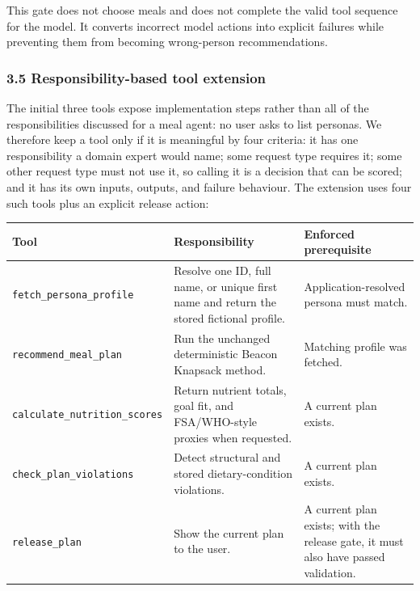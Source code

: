 \documentclass[
  10pt,
  letterpaper,
]{article}
\begin{document}
This gate does not choose meals and does not complete the valid tool
sequence for the model. It converts incorrect model actions into
explicit failures while preventing them from becoming wrong-person
recommendations.

\subsubsection{3.5 Responsibility-based tool
extension}\label{responsibility-based-tool-extension}

The initial three tools expose implementation steps rather than all of
the responsibilities discussed for a meal agent: no user asks to list
personas. We therefore keep a tool only if it is meaningful by four
criteria: it has one responsibility a domain expert would name; some
request type requires it; some other request type must not use it, so
calling it is a decision that can be scored; and it has its own inputs,
outputs, and failure behaviour. The extension uses four such tools plus
an explicit release action:

\begin{longtable}[]{@{}
  >{\raggedright\arraybackslash}p{}
  >{\raggedright\arraybackslash}p{}
  >{\raggedright\arraybackslash}p{}@{}}
\toprule\noalign{}
\begin{minipage}[b]{\linewidth}\raggedright
Tool
\end{minipage} & \begin{minipage}[b]{\linewidth}\raggedright
Responsibility
\end{minipage} & \begin{minipage}[b]{\linewidth}\raggedright
Enforced prerequisite
\end{minipage} \\
\midrule\noalign{}
\endhead
\bottomrule\noalign{}
\endlastfoot
\texttt{fetch\_persona\_profile} & Resolve one ID, full name, or unique
first name and return the stored fictional profile. &
Application-resolved persona must match. \\
\texttt{recommend\_meal\_plan} & Run the unchanged deterministic Beacon
Knapsack method. & Matching profile was fetched. \\
\texttt{calculate\_nutrition\_scores} & Return nutrient totals, goal
fit, and FSA/WHO-style proxies when requested. & A current plan
exists. \\
\texttt{check\_plan\_violations} & Detect structural and stored
dietary-condition violations. & A current plan exists. \\
\texttt{release\_plan} & Show the current plan to the user. & A current
plan exists; with the release gate, it must also have passed
validation. \\
\end{longtable}
\end{document}
